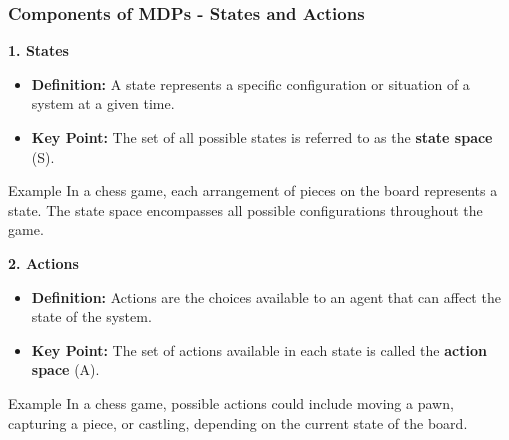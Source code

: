\documentclass[aspectratio=169]{beamer}
\begin{document}
\begin{frame}[fragile]
    \frametitle{Components of MDPs - States and Actions}
    
    \textbf{1. States}
    \begin{itemize}
        \item \textbf{Definition:} A state represents a specific configuration or situation of a system at a given time.
        \item \textbf{Key Point:} The set of all possible states is referred to as the \textbf{state space} (S).
    \end{itemize}
    
    \begin{block}{Example}
        In a chess game, each arrangement of pieces on the board represents a state. The state space encompasses all possible configurations throughout the game.
    \end{block}
    
    \textbf{2. Actions}
    \begin{itemize}
        \item \textbf{Definition:} Actions are the choices available to an agent that can affect the state of the system.
        \item \textbf{Key Point:} The set of actions available in each state is called the \textbf{action space} (A).
    \end{itemize}
    
    \begin{block}{Example}
        In a chess game, possible actions could include moving a pawn, capturing a piece, or castling, depending on the current state of the board.
    \end{block}
\end{frame}
\end{document}
